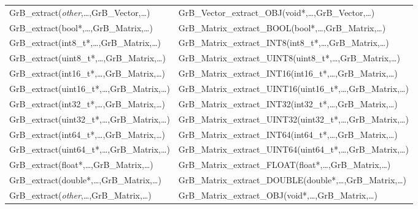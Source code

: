 \begin{table}[htb]
{\begin{tabular}{l|l}
{\sf GrB\_extract(\emph{other},\ldots,GrB\_Vector,\ldots)}	& {\sf GrB\_Vector\_extract\_OBJ(void*,\ldots,GrB\_Vector,\ldots)} \\ 
{\sf GrB\_extract(bool*,\ldots,GrB\_Matrix,\ldots)}		& {\sf GrB\_Matrix\_extract\_BOOL(bool*,\ldots,GrB\_Matrix,\ldots)} \\
{\sf GrB\_extract(int8\_t*,\ldots,GrB\_Matrix,\ldots)}		& {\sf GrB\_Matrix\_extract\_INT8(int8\_t*,\ldots,GrB\_Matrix,\ldots)} \\
{\sf GrB\_extract(uint8\_t*,\ldots,GrB\_Matrix,\ldots)}		& {\sf GrB\_Matrix\_extract\_UINT8(uint8\_t*,\ldots,GrB\_Matrix,\ldots)} \\
{\sf GrB\_extract(int16\_t*,\ldots,GrB\_Matrix,\ldots)}		& {\sf GrB\_Matrix\_extract\_INT16(int16\_t*,\ldots,GrB\_Matrix,\ldots)} \\
{\sf GrB\_extract(uint16\_t*,\ldots,GrB\_Matrix,\ldots)}	& {\sf GrB\_Matrix\_extract\_UINT16(uint16\_t*,\ldots,GrB\_Matrix,\ldots)} \\
{\sf GrB\_extract(int32\_t*,\ldots,GrB\_Matrix,\ldots)}		& {\sf GrB\_Matrix\_extract\_INT32(int32\_t*,\ldots,GrB\_Matrix,\ldots)} \\
{\sf GrB\_extract(uint32\_t*,\ldots,GrB\_Matrix,\ldots)}	& {\sf GrB\_Matrix\_extract\_UINT32(uint32\_t*,\ldots,GrB\_Matrix,\ldots)} \\
{\sf GrB\_extract(int64\_t*,\ldots,GrB\_Matrix,\ldots)}		& {\sf GrB\_Matrix\_extract\_INT64(int64\_t*,\ldots,GrB\_Matrix,\ldots)} \\
{\sf GrB\_extract(uint64\_t*,\ldots,GrB\_Matrix,\ldots)}	& {\sf GrB\_Matrix\_extract\_UINT64(uint64\_t*,\ldots,GrB\_Matrix,\ldots)} \\
{\sf GrB\_extract(float*,\ldots,GrB\_Matrix,\ldots)}		& {\sf GrB\_Matrix\_extract\_FLOAT(float*,\ldots,GrB\_Matrix,\ldots)} \\
{\sf GrB\_extract(double*,\ldots,GrB\_Matrix,\ldots)}		& {\sf GrB\_Matrix\_extract\_DOUBLE(double*,\ldots,GrB\_Matrix,\ldots)} \\
{\sf GrB\_extract(\emph{other},\ldots,GrB\_Matrix,\ldots)}	& {\sf GrB\_Matrix\_extract\_OBJ(void*,\ldots,GrB\_Matrix,\ldots)} \\ \hline
\end{tabular}
}
\label{Tab:NonPolymorphic2}
\end{table}
